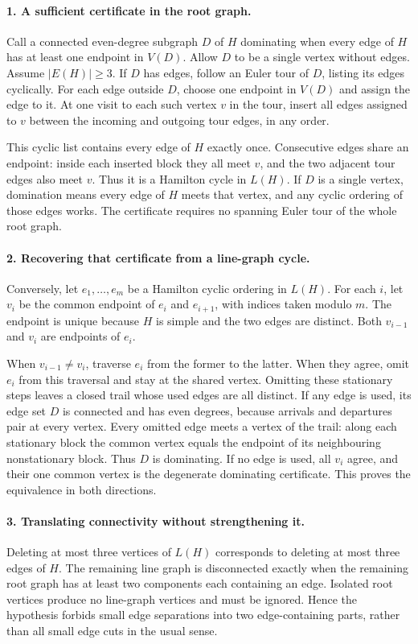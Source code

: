 \documentclass[11pt,a4paper]{article}
\begin{document}
\paragraph{1. A sufficient certificate in the root graph.}
Call a connected even-degree subgraph $D$ of $H$ dominating when every
edge of $H$ has at least one endpoint in $V(D)$. Allow $D$ to be
a single vertex without edges. Assume $|E(H)|\ge3$.
If $D$ has edges, follow an Euler tour of $D$, listing its edges
cyclically. For each edge outside $D$, choose one endpoint in $V(D)$
and assign the edge to it. At one visit to each such vertex $v$
in the tour, insert all edges assigned to $v$ between the incoming
and outgoing tour edges, in any order.

This cyclic list contains every edge of $H$ exactly once. Consecutive
edges share an endpoint: inside each inserted block they all meet
$v$, and the two adjacent tour edges also meet $v$. Thus it is
a Hamilton cycle in $L(H)$. If $D$ is a single vertex, domination
means every edge of $H$ meets that vertex, and any cyclic ordering
of those edges works. The certificate requires no spanning Euler tour
of the whole root graph.

\paragraph{2. Recovering that certificate from a line-graph cycle.}
Conversely, let $e_1,\ldots,e_m$ be a Hamilton cyclic ordering in
$L(H)$. For each $i$, let $v_i$ be the common endpoint of $e_i$
and $e_{i+1}$, with indices taken modulo $m$. The endpoint is unique
because $H$ is simple and the two edges are distinct. Both $v_{i-1}$
and $v_i$ are endpoints of $e_i$.

When $v_{i-1}\ne v_i$, traverse $e_i$ from the former to the latter.
When they agree, omit $e_i$ from this traversal and stay at the
shared vertex. Omitting these stationary steps leaves a closed trail
whose used edges are all distinct. If any edge is used, its edge
set $D$ is connected and has even degrees, because arrivals and
departures pair at every vertex. Every omitted edge meets a vertex
of the trail: along each stationary block the common vertex equals
the endpoint of its neighbouring nonstationary block. Thus $D$
is dominating. If no edge is used, all $v_i$ agree, and their one
common vertex is the degenerate dominating certificate. This proves
the equivalence in both directions.

\paragraph{3. Translating connectivity without strengthening it.}
Deleting at most three vertices of $L(H)$ corresponds to deleting
at most three edges of $H$. The remaining line graph is disconnected
exactly when the remaining root graph has at least two components
each containing an edge. Isolated root vertices produce no line-graph
vertices and must be ignored. Hence the hypothesis forbids small edge
separations into two edge-containing parts, rather than all small
edge cuts in the usual sense.
\end{document}
